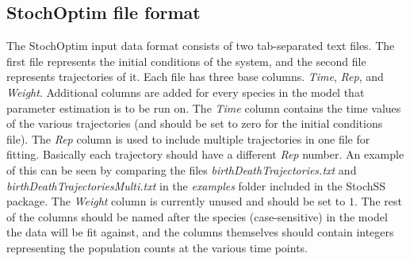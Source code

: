 \subsection{StochOptim file format}
The StochOptim input data format consists of two tab-separated text files.
The first file represents the initial conditions of the system, and the second file represents trajectories of it.
Each file has three base columns. \textit{Time}, \textit{Rep}, and \textit{Weight}. Additional columns are added for every species in the model that parameter estimation is to be run on. The \textit{Time} column contains the time values of the various trajectories (and should be set to zero for the initial conditions file). The \textit{Rep} column is used to include multiple trajectories in one file for fitting. Basically each trajectory should have a different \textit{Rep} number. An example of this can be seen by comparing the files \textit{birthDeathTrajectories.txt} and \textit{birthDeathTrajectoriesMulti.txt} in the \textit{examples} folder included in the StochSS package. The \textit{Weight} column is currently unused and should be set to $1$. The rest of the columns should be named after the species (case-sensitive) in the model the data will be fit against, and the columns themselves should contain integers representing the population counts at the various time points.


